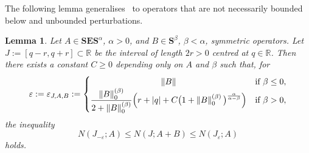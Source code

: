 \documentclass[10pt]{amsart}
\newtheorem{lemm}[theo]{Lemma}\newtheorem{prop}[theo]{Proposition}\newtheorem{coro}[theo]{Corollary}\newtheorem{conj}[theo]{Conjecture}
\theoremstyle{definition}\newtheorem{defi}[theo]{Definition}\newtheorem{rema}[theo]{Remark}\newtheorem{exam}[theo]{Example}\newtheorem{nota}[theo]{Notation}
\newcommand{\R}{\mathbb R}
\newcommand{\BE}{\mathbf E}
\newcommand{\BS}{\mathbf S}
\renewcommand{\epsilon}{\varepsilon}
\newcommand{\abs}[1]{\left\lvert #1 \right\rvert}
\newcommand{\norm}[1]{\left\| #1 \right\|}
\newcommand{\snorm}[3]{\left\| #1\right\|_{#3}^{(#2)}}
\begin{document}
The following lemma generalises~\cite[Corollary~4.3]{ParSht2012} to operators that are not necessarily bounded below and unbounded perturbations.

\begin{lemm} \label{lem:monotonicity}
Let $A\in\BS\BE\BS^\alpha$, $\alpha>0$, and $B\in\BS^\beta$, $\beta<\alpha$, symmetric operators. Let $J:=[q-r,q+r]\subset \R$ be the interval of length $2r > 0$ centred at $q\in\R$. Then there exists a constant $C\geq 0$ depending only on $A$ and $\beta$ such that, for
\begin{equation}\label{eq:epsa}
\epsilon:=\epsilon_{J,A,B}:=
\begin{cases}
\hfill\norm{B}\hfill & \text{if }\beta \leq 0,\\
\dfrac{\snorm{B}{\beta}{0}}{2 +\snorm{B}{\beta}{0}}\Big(r + \abs q+ C\big(1+\snorm{B}{\beta}{0}\big)^{\frac{\alpha}{\alpha-\beta}}\Big)& \text{if } \beta>0,
\end{cases}
\end{equation}
the inequality
\begin{equation}\label{eq:bounds}
N(J_{-\epsilon}; A)\leq N(J; A+B)\leq N(J_{\epsilon}; A)
\end{equation}
holds.
\end{lemm}
\end{document}
